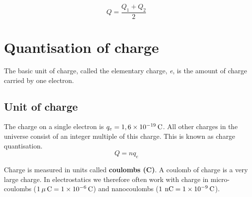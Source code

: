     \begin{equation*}
    Q=\frac{{Q}_{1}+{Q}_{2}}{2}
      \end{equation*}



\section{Quantisation of charge}
            \nopagebreak
The basic unit of charge, called the elementary charge, \textsl{e}, is
the amount of charge carried by one electron.\par 

            \label{m38781*eip-97}
            \subsection{Unit of charge}
\label{m38781*eip-517}The charge on a single electron is ${q}_{e}=1,6\times{10}^{-19}\phantom{\rule{2pt}{0ex}}\text{C}$. All other charges in the universe consist of an integer multiple of this charge. This is known as charge quantisation.      
\begin{equation*}
 \boxed{Q=nq_{e}}
\end{equation*}


\label{m38781*secfhsst!!!underscore!!!id290} 
      \nopagebreak
\label{m38781*id200658}Charge is measured in units called \textbf{coulombs (C)}. A coulomb of charge is a very large charge. In electrostatics we therefore often work with charge in micro-coulombs ($1\phantom{\rule{2pt}{0ex}}\mu \phantom{\rule{2pt}{0ex}}\text{C}=1\ensuremath{\times}{10}^{-6}\phantom{\rule{2pt}{0ex}}\text{C}$) and nanocoulombs ($1\phantom{\rule{2pt}{0ex}}\phantom{\rule{2pt}{0ex}}\text{nC}=1\ensuremath{\times}{10}^{-9}\phantom{\rule{2pt}{0ex}}\text{C}$).
\par 
 
